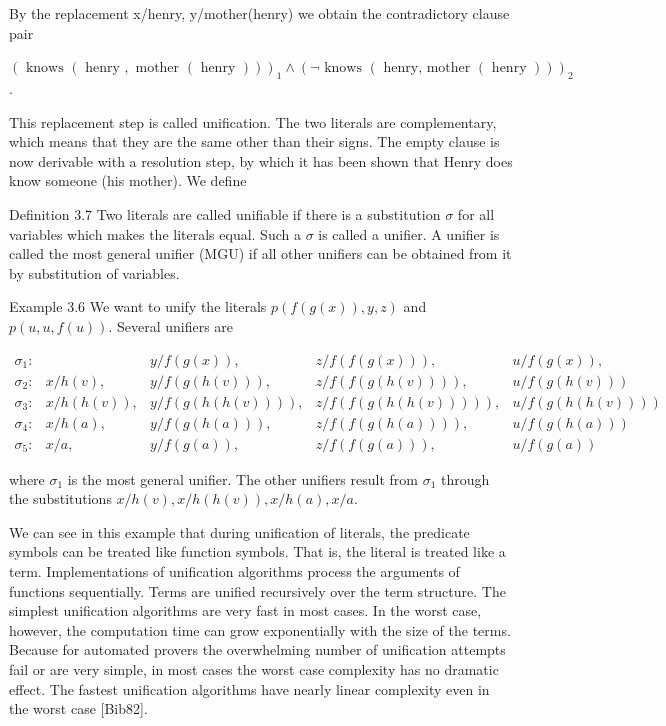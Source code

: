 \documentclass[10pt]{article}
\begin{document}
By the replacement x/henry, y/mother(henry) we obtain the contradictory clause pair

\begin{displayquote}
$(\text { knows }(\text { henry }, \text { mother }(\text { henry })))_{1} \wedge(\neg \text { knows }(\text { henry, mother }(\text { henry })))_{2}$.
\end{displayquote}

This replacement step is called unification. The two literals are complementary, which means that they are the same other than their signs. The empty clause is now derivable with a resolution step, by which it has been shown that Henry does know someone (his mother). We define

Definition 3.7 Two literals are called unifiable if there is a substitution $\sigma$ for all variables which makes the literals equal. Such a $\sigma$ is called a unifier. A unifier is called the most general unifier (MGU) if all other unifiers can be obtained from it by substitution of variables.

Example 3.6 We want to unify the literals $p(f(g(x)), y, z)$ and $p(u, u, f(u))$. Several unifiers are

$$
\begin{array}{lllll}
\sigma_{1}: & & y / f(g(x)), & z / f(f(g(x))), & u / f(g(x)), \\
\sigma_{2}: & x / h(v), & y / f(g(h(v))), & z / f(f(g(h(v)))), & u / f(g(h(v))) \\
\sigma_{3}: & x / h(h(v)), & y / f(g(h(h(v)))), & z / f(f(g(h(h(v))))), & u / f(g(h(h(v)))) \\
\sigma_{4}: & x / h(a), & y / f(g(h(a))), & z / f(f(g(h(a)))), & u / f(g(h(a))) \\
\sigma_{5}: & x / a, & y / f(g(a)), & z / f(f(g(a))), & u / f(g(a))
\end{array}
$$

where $\sigma_{1}$ is the most general unifier. The other unifiers result from $\sigma_{1}$ through the substitutions $x / h(v), x / h(h(v)), x / h(a), x / a$.

We can see in this example that during unification of literals, the predicate symbols can be treated like function symbols. That is, the literal is treated like a term. Implementations of unification algorithms process the arguments of functions sequentially. Terms are unified recursively over the term structure. The simplest unification algorithms are very fast in most cases. In the worst case, however, the computation time can grow exponentially with the size of the terms. Because for automated provers the overwhelming number of unification attempts fail or are very simple, in most cases the worst case complexity has no dramatic effect. The fastest unification algorithms have nearly linear complexity even in the worst case [Bib82].
\end{document}
